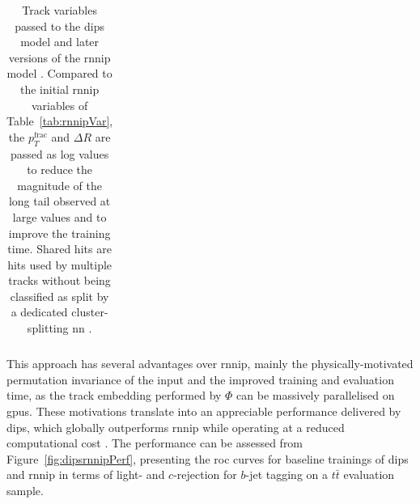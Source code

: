 \begin{table}[h]
\begin{center}
\begin{tabular}{C{3cm}|C{13cm}}
      \end{tabular}
      \caption{Track variables passed to the \gls{dips} model and later versions of the \gls{rnnip} model \cite{ATL-PHYS-PUB-2020-014}. Compared to the initial \gls{rnnip} variables of Table~\ref{tab:rnnipVar}, the $p_T^{\textrm{frac}}$ and $\Delta R$ are passed as log values to reduce the magnitude of the long tail observed at large values and to improve the training time. Shared hits are hits used by multiple tracks without being classified as split by a dedicated cluster-splitting \gls{nn} \cite{ATLAS-tracks-algo}.}
    \label{tab:dipsVar}
  \end{center}
\end{table}

This approach has several advantages over \gls{rnnip}, mainly the physically-motivated permutation invariance of the input and the improved training and evaluation time, as the track embedding performed by $\Phi$ can be massively parallelised on \glspl{gpu}. These motivations translate into an appreciable performance delivered by \gls{dips}, which globally outperforms \gls{rnnip} while operating at a reduced computational cost \cite{ATL-PHYS-PUB-2020-014}. The performance can be assessed from Figure~\ref{fig:dipsrnnipPerf}, presenting the \gls{roc} curves for baseline trainings of \gls{dips} and \gls{rnnip} in terms of light- and $c$-rejection for $b$-jet tagging on a $t\bar{t}$ evaluation sample. \\

